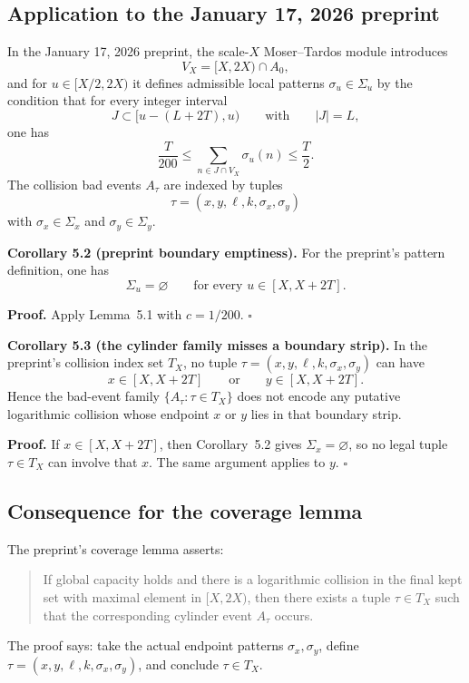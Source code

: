 \subsection{Application to the January 17, 2026 preprint}

In the January 17, 2026 preprint, the scale-$X$ Moser--Tardos module introduces
\[
V_X=[X,2X)\cap A_0,
\]
and for $u\in[X/2,2X)$ it defines admissible local patterns $\sigma_u\in\Sigma_u$ by the condition that for every integer interval
\[
J\subset [u-(L+2T),u)
\qquad\text{with}\qquad |J|=L,
\]
one has
\[
\frac{T}{200}
\le
\sum_{n\in J\cap V_X}\sigma_u(n)
\le
\frac{T}{2}.
\]
The collision bad events $A_\tau$ are indexed by tuples
\[
\tau=(x,y,\ell,k,\sigma_x,\sigma_y)
\]
with $\sigma_x\in\Sigma_x$ and $\sigma_y\in\Sigma_y$.

\textbf{Corollary 5.2 (preprint boundary emptiness).}
For the preprint's pattern definition, one has
\[
\Sigma_u=\varnothing
\qquad\text{for every }u\in[X,X+2T].
\]

\textbf{Proof.}
Apply Lemma~5.1 with $c=1/200$. \hfill$\square$

\textbf{Corollary 5.3 (the cylinder family misses a boundary strip).}
In the preprint's collision index set $T_X$, no tuple $\tau=(x,y,\ell,k,\sigma_x,\sigma_y)$ can have
\[
x\in[X,X+2T]
\qquad\text{or}\qquad
y\in[X,X+2T].
\]
Hence the bad-event family $\{A_\tau:\tau\in T_X\}$ does not encode any putative logarithmic collision whose endpoint $x$ or $y$ lies in that boundary strip.

\textbf{Proof.}
If $x\in[X,X+2T]$, then Corollary~5.2 gives $\Sigma_x=\varnothing$, so no legal tuple $\tau\in T_X$ can involve that $x$. The same argument applies to $y$. \hfill$\square$

\subsection{Consequence for the coverage lemma}

The preprint's coverage lemma asserts:

\begin{quote}
If global capacity holds and there is a logarithmic collision in the final kept set with maximal element in $[X,2X)$, then there exists a tuple $\tau\in T_X$ such that the corresponding cylinder event $A_\tau$ occurs.
\end{quote}

The proof says: take the actual endpoint patterns $\sigma_x,\sigma_y$, define $\tau=(x,y,\ell,k,\sigma_x,\sigma_y)$, and conclude $\tau\in T_X$.

